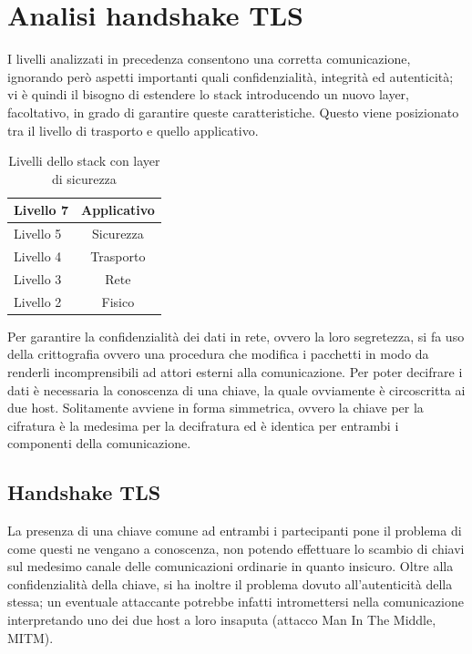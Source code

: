 \chapter{Analisi handshake TLS}
I livelli analizzati in precedenza consentono una corretta comunicazione, ignorando però aspetti importanti quali confidenzialità, integrità ed autenticità; vi è quindi il bisogno di estendere lo stack introducendo un nuovo layer, facoltativo, in grado di garantire queste caratteristiche.
Questo viene posizionato tra il livello di trasporto e quello applicativo. 

\begin{table}[h]
	\centering
	\begin{tabular}{| l | c |}
		\hline
		Livello 7 & Applicativo
		\\
		\hline
		\rowcolor{yellow!10}Livello 5 & Sicurezza
		\\
		\hline
		Livello 4 & Trasporto
		\\
		\hline
		Livello 3 & Rete
		\\
		\hline
		Livello 2 & Fisico
		\\
		\hline
		
	\end{tabular}
	\caption{Livelli dello stack con layer di sicurezza}
	\label{tab:stackTLS}
\end{table}

Per garantire la confidenzialità dei dati in rete, ovvero la loro segretezza, si fa uso della crittografia ovvero una procedura che modifica i pacchetti in modo da renderli incomprensibili ad attori esterni alla comunicazione. Per poter decifrare i dati è necessaria la conoscenza di una chiave, la quale ovviamente è circoscritta ai due host.
Solitamente avviene in forma simmetrica, ovvero la chiave per la cifratura è la medesima per la decifratura ed è identica per entrambi i componenti della comunicazione.

\section{Handshake TLS}
La presenza di una chiave comune ad entrambi i partecipanti pone il problema di come questi ne vengano a conoscenza, non potendo effettuare lo scambio di chiavi sul medesimo canale delle comunicazioni ordinarie in quanto insicuro.
Oltre alla confidenzialità della chiave, si ha inoltre il problema dovuto all'autenticità della stessa; un eventuale attaccante potrebbe infatti intromettersi nella comunicazione interpretando uno dei due host a loro insaputa (attacco Man In The Middle, MITM).

